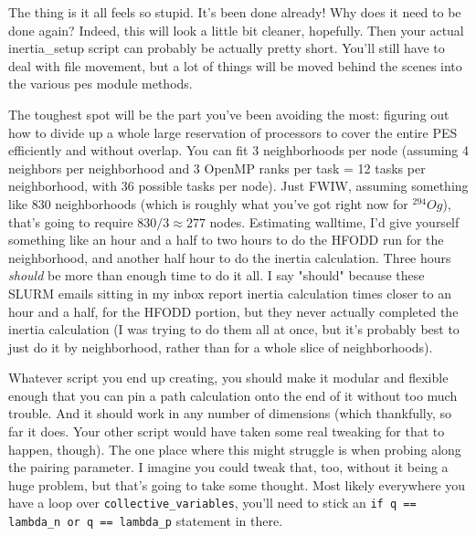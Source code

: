 \documentclass[]{report}
\begin{document}
The thing is it all feels so stupid. It's been done already! Why does it need to be done again? Indeed, this will look a little bit cleaner, hopefully. Then your actual inertia\_setup script can probably be actually pretty short. You'll still have to deal with file movement, but a lot of things will be moved behind the scenes into the various pes module methods.

The toughest spot will be the part you've been avoiding the most: figuring out how to divide up a whole large reservation of processors to cover the entire PES efficiently and without overlap. You can fit 3 neighborhoods per node (assuming 4 neighbors per neighborhood and 3 OpenMP ranks per task = 12 tasks per neighborhood, with 36 possible tasks per node). Just FWIW, assuming something like 830 neighborhoods (which is roughly what you've got right now for $^{294}Og$), that's going to require $830/3 \approx 277$ nodes. Estimating walltime, I'd give yourself something like an hour and a half to two hours to do the HFODD run for the neighborhood, and another half hour to do the inertia calculation. Three hours \textit{should} be more than enough time to do it all. I say "should" because these SLURM emails sitting in my inbox report inertia calculation times closer to an hour and a half, for the HFODD portion, but they never actually completed the inertia calculation (I was trying to do them all at once, but it's probably best to just do it by neighborhood, rather than for a whole slice of neighborhoods).

Whatever script you end up creating, you should make it modular and flexible enough that you can pin a path calculation onto the end of it without too much trouble. And it should work in any number of dimensions (which thankfully, so far it does. Your other script would have taken some real tweaking for that to happen, though). The one place where this might struggle is when probing along the pairing parameter. I imagine you could tweak that, too, without it being a huge problem, but that's going to take some thought. Most likely everywhere you have a loop over \texttt{collective\_variables}, you'll need to stick an \texttt{if q == lambda\_n or q == lambda\_p} statement in there.
\end{document}

